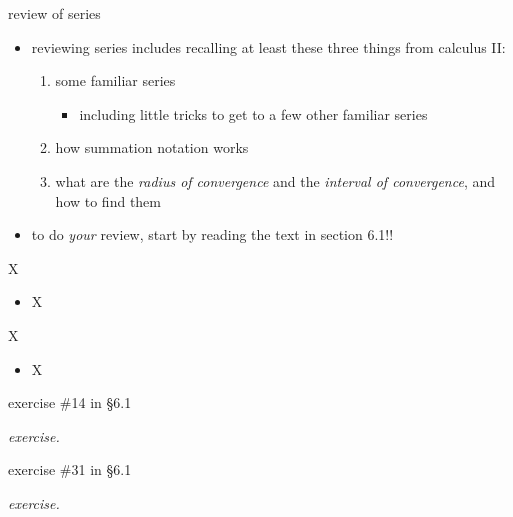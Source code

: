 \documentclass[urlcolor=blue,dvipsnames]{beamer}
\begin{document}
\begin{frame}{review of series}

\begin{itemize}
\item reviewing series includes recalling at least these three things from calculus II:
    \begin{enumerate}
    \item some familiar series
        \begin{itemize}
        \item including little tricks to get to a few other familiar series
        \end{itemize}
    \item how summation notation works
    \item what are the \emph{radius of convergence} and the \emph{interval of convergence}, and how to find them
    \end{enumerate}

\bigskip
\item to do \emph{your} review, start by \alert{reading the text in section 6.1}!!
\end{itemize}
\end{frame}


\begin{frame}{X}

\begin{itemize}
\item X
\end{itemize}
\end{frame}

\begin{frame}{X}

\begin{itemize}
\item X
\end{itemize}
\end{frame}



\begin{frame}{exercise \#14 in \S 6.1}

\noindent \emph{exercise.}  

\vspace{60mm}
\end{frame}


\begin{frame}{exercise \#31 in \S 6.1}

\noindent \emph{exercise.}  

\vspace{60mm}
\end{frame}
\end{document}
